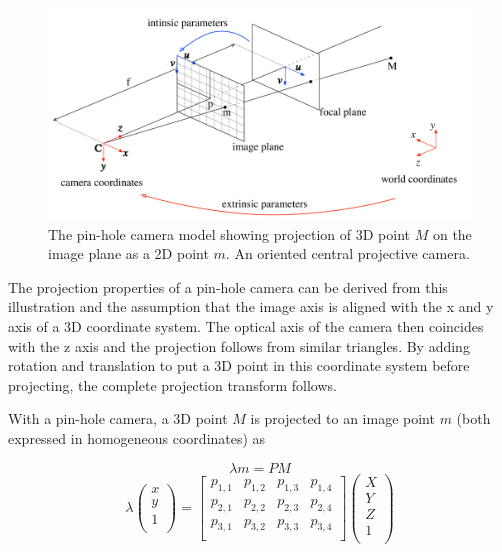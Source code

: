 \begin{figure}[ht]
	\begin{center}
		\includegraphics[keepaspectratio,width=\textwidth]{fig/camera-model.pdf}
	\end{center}
	\caption{The pin-hole camera model showing projection of 3D point $M$ on the image plane as a 2D point $m$. An oriented central projective camera.}
	\label{fig:cameramodel}
\end{figure}

The projection properties of a pin-hole camera can be derived from this illustration and the assumption that the image axis is aligned with the x and y axis of a 3D coordinate system. The optical axis of the camera then coincides with the z axis and the projection follows from similar triangles. By adding rotation and translation to put a 3D point in this coordinate system before projecting, the complete projection transform follows.

With a pin-hole camera, a 3D point $M$ is projected to an image point $m$ (both expressed in homogeneous coordinates) as

\begin{equation}
	\lambda m= PM
	\label{eq:point-projection}
\end{equation}
\begin{equation}
	\lambda
	\begin{pmatrix}
		x \\
		y \\
		1 \\
	\end{pmatrix}
	=
	\begin{bmatrix}
		p_{1,1} & p_{1,2} & p_{1,3}  & p_{1,4} \\
		p_{2,1} & p_{2,2} & p_{2,3}  & p_{2,4} \\
		p_{3,1} & p_{3,2} & p_{3,3}  & p_{3,4} \\
	\end{bmatrix}
	\begin{pmatrix}
		X \\
		Y \\
		Z \\
		1 \\
	\end{pmatrix}
\end{equation}

